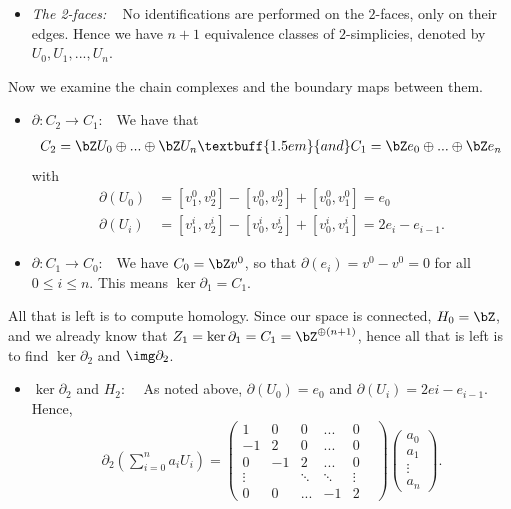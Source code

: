 \begin{homework}[e]
\begin{prf}
\begin{itemize}
      \item \emph{The 2-faces:} ~ No identifications are performed on the $2$-faces, only on their edges. Hence we have $n+1$ equivalence classes of $2$-simplicies, denoted by $U_0,U_1,...,U_n$.
    \end{itemize}
    Now we examine the chain complexes and the boundary maps between them.
    \begin{itemize}
      \item $\partial:C_2\to C_1:$~ We have that
        \begin{align*}
          C_2 = \bZ U_0\oplus ... \oplus \bZ U_n\textbuff{1.5em}{and} C_1 = \bZ e_0\oplus ...\oplus \bZ e_n
        \end{align*}
        with
        \begin{align*}
          \partial(U_0) &= [v^0_1,v^0_2] - [v^0_0,v^0_2] + [v^0_0,v^0_1] = e_0 \\ 
          \partial(U_i) &= [v^i_1,v^i_2] - [v^i_0,v^i_2] + [v^i_0,v^i_1] = 2e_i - e_{i-1}.
        \end{align*}
      \item $\partial:C_1\to C_0:$~ We have $C_0 = \bZ v^0$, so that $\partial(e_i) = v^0 - v^0 = 0$ for all $0\leq i\leq n$. This means $\ker\partial_1 = C_1$.
    \end{itemize}
    All that is left is to compute homology. Since our space is connected, $H_0 = \bZ$, and we already know that $Z_1 = \ker \partial_1 = C_1 = \bZ^{\oplus (n+1)}$, hence all that is left is to find $\ker \partial_2$ and $\img \partial_2$.
    \begin{itemize}
      \item $\ker \partial_2$ and $H_2:$ ~ As noted above, $\partial(U_0) = e_0$ and $\partial(U_i) = 2ei - e_{i-1}$. Hence,
      \begin{align*}
        \partial_2\left(\sum_{i = 0}^n a_iU_i\right) =
        \begin{pmatrix}	
          1 & 0 & 0 & ... & 0 \\ 
          -1 & 2 & 0 & ... & 0 \\
          0 & -1 & 2 & ... & 0 \\
          \vdots & & \ddots & \ddots & \vdots & \\
          0 & 0 & ... & -1 & 2
        \end{pmatrix}\begin{pmatrix} a_0 \\ a_1 \\ \vdots \\ a_n \end{pmatrix}.

\end{align*}
\end{itemize}
\end{prf}
\end{homework}
